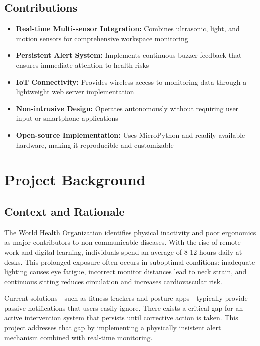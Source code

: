 \documentclass[12pt,a4paper]{article}
\begin{document}
\subsection{Contributions}

\begin{itemize}
\item \textbf{Real-time Multi-sensor Integration:} Combines ultrasonic, light, and motion sensors for comprehensive workspace monitoring
\item \textbf{Persistent Alert System:} Implements continuous buzzer feedback that ensures immediate attention to health risks
\item \textbf{IoT Connectivity:} Provides wireless access to monitoring data through a lightweight web server implementation
\item \textbf{Non-intrusive Design:} Operates autonomously without requiring user input or smartphone applications
\item \textbf{Open-source Implementation:} Uses MicroPython and readily available hardware, making it reproducible and customizable
\end{itemize}

\section{Project Background}

\subsection{Context and Rationale}

The World Health Organization identifies physical inactivity and poor ergonomics as major contributors to non-communicable diseases. With the rise of remote work and digital learning, individuals spend an average of 8-12 hours daily at desks. This prolonged exposure often occurs in suboptimal conditions: inadequate lighting causes eye fatigue, incorrect monitor distances lead to neck strain, and continuous sitting reduces circulation and increases cardiovascular risk.

Current solutions—such as fitness trackers and posture apps—typically provide passive notifications that users easily ignore. There exists a critical gap for an active intervention system that persists until corrective action is taken. This project addresses that gap by implementing a physically insistent alert mechanism combined with real-time monitoring.
\end{document}
